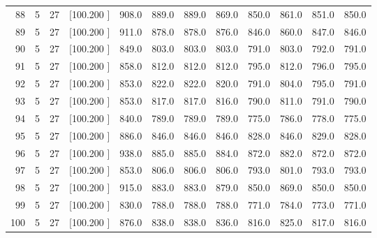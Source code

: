 \documentclass[12pt,a4paper]{article}
\begin{document}
\begin{center}
{\begin{tabular}{r r r r r r r r r r r r}
  88&  5& 27&[100.200   ]&   908.0&   889.0&   889.0&   869.0&   850.0&   861.0&   851.0&   850.0\\[-0.02in]
  89&  5& 27&[100.200   ]&   911.0&   878.0&   878.0&   876.0&   846.0&   860.0&   847.0&   846.0\\[-0.02in]
  90&  5& 27&[100.200   ]&   849.0&   803.0&   803.0&   803.0&   791.0&   803.0&   792.0&   791.0\\[-0.02in]
  91&  5& 27&[100.200   ]&   858.0&   812.0&   812.0&   812.0&   795.0&   812.0&   796.0&   795.0\\[-0.02in]
  92&  5& 27&[100.200   ]&   853.0&   822.0&   822.0&   820.0&   791.0&   804.0&   795.0&   791.0\\[-0.02in]
  93&  5& 27&[100.200   ]&   853.0&   817.0&   817.0&   816.0&   790.0&   811.0&   791.0&   790.0\\[-0.02in]
  94&  5& 27&[100.200   ]&   840.0&   789.0&   789.0&   789.0&   775.0&   786.0&   778.0&   775.0\\[-0.02in]
  95&  5& 27&[100.200   ]&   886.0&   846.0&   846.0&   846.0&   828.0&   846.0&   829.0&   828.0\\[-0.02in]
  96&  5& 27&[100.200   ]&   938.0&   885.0&   885.0&   884.0&   872.0&   882.0&   872.0&   872.0\\[-0.02in]
  97&  5& 27&[100.200   ]&   853.0&   806.0&   806.0&   806.0&   793.0&   801.0&   793.0&   793.0\\[-0.02in]
  98&  5& 27&[100.200   ]&   915.0&   883.0&   883.0&   879.0&   850.0&   869.0&   850.0&   850.0\\[-0.02in]
  99&  5& 27&[100.200   ]&   830.0&   788.0&   788.0&   788.0&   771.0&   784.0&   773.0&   771.0\\[-0.02in]
 100&  5& 27&[100.200   ]&   876.0&   838.0&   838.0&   836.0&   816.0&   825.0&   817.0&   816.0\\[-0.02in]

\hline
\end{tabular}}
\end{center}
\end{document}
